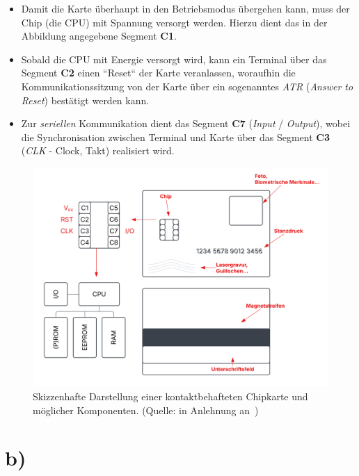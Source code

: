 \begin{itemize}
\begin{itemize}
        \item Damit die Karte überhaupt in den Betriebsmodus übergehen kann, muss der Chip (die CPU) mit Spannung versorgt werden. Hierzu dient das in der Abbildung angegebene Segment \textbf{C1}.

        \item Sobald die CPU mit Energie versorgt wird, kann ein Terminal über das Segment \textbf{C2} einen ``Reset`` der Karte veranlassen, woraufhin die Kommunikationssitzung von der Karte über ein sogenanntes \textit{ATR} (\textit{Answer to Reset}) bestätigt werden kann.

        \item Zur \textit{seriellen} Kommunikation dient das Segment \textbf{C7} (\textit{Input} / \textit{Output}), wobei die Synchronisation zwischen Terminal und Karte über das Segment \textbf{C3} (\textit{CLK} - Clock, Takt) realisiert wird.
    \end{itemize}
\end{itemize}

\begin{figure}
    \centering
    \includegraphics[scale=0.4]{aufgabe 1/img/chipkarte.svg}
    \caption{Skizzenhafte Darstellung einer kontaktbehafteten Chipkarte und möglicher Komponenten. (Quelle: in Anlehnung an~\cite[\textbf{Abb. 2.1}, 9 sowie \textbf{Abb. 2.2}, 10]{ITS5})}
    \label{fig:chipkarte}
\end{figure}


\section{b)}

